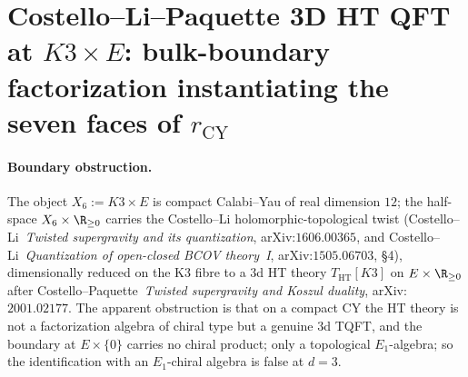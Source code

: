 \section{Costello--Li--Paquette 3D HT QFT at \texorpdfstring{$K3\times E$}{K3x E}:
bulk-boundary factorization instantiating the seven faces of
\texorpdfstring{$r_{\mathrm{CY}}$}{r-CY}}
\label{sec:qgfnd-clp-3d-ht-k3e-seven-faces}

\providecommand{\SCchtop}{\mathsf{SC}^{\mathrm{ch,top}}}
\providecommand{\HTQFT}{\mathrm{HTQFT}}
\providecommand{\HDelta}{\mathbf{H}_{\Delta_5}}
\providecommand{\Obsbd}{\mathrm{Obs}^{q,\partial}}
\providecommand{\Obsbulk}{\mathrm{Obs}^{q,\mathrm{cl}}}

\paragraph{Boundary obstruction.} The object $X_6 := K3\times E$ is compact
Calabi--Yau of real dimension $12$; the half-space
$X_6\times\R_{\geq 0}$ carries the Costello--Li holomorphic-topological
twist (Costello--Li~\textit{Twisted supergravity and its quantization},
arXiv:$1606.00365$, and Costello--Li~\textit{Quantization of
open-closed BCOV theory~I}, arXiv:$1505.06703$, \S 4), dimensionally
reduced on the K3 fibre to a $3$d HT theory $T_{\mathrm{HT}}[K3]$ on
$E\times\R_{\geq 0}$ after Costello--Paquette~\textit{Twisted
supergravity and Koszul duality}, arXiv:$2001.02177$. The apparent
obstruction is that on a compact CY the HT theory is not a factorization algebra
of chiral type but a genuine $3$d TQFT, and the boundary at
$E\times\{0\}$ carries no chiral product; only a topological
$E_1$-algebra; so the identification with an $E_1$-chiral algebra
is false at $d=3$.

